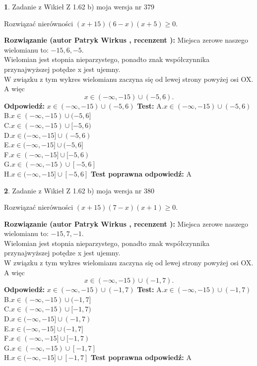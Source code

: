 \documentclass[12pt, a4paper]{article}
\theoremstyle{definition} %
\newtheorem{zad}{}
\newcommand{\zadStart}[1]{\begin{zad}#1\newline}
\newcommand{\zadStop}{\end{zad}}
\newcommand{\rozwStart}[2]{\noindent \textbf{Rozwiązanie (autor #1 , recenzent #2): }\newline}
\newcommand{\rozwStop}{\newline}
\newcommand{\odpStart}{\noindent \textbf{Odpowiedź:}\newline}
\newcommand{\odpStop}{\newline}
\newcommand{\testStart}{\noindent \textbf{Test:}\newline}
\newcommand{\testStop}{\newline}
\newcommand{\kluczStart}{\noindent \textbf{Test poprawna odpowiedź:}\newline}
\newcommand{\kluczStop}{\newline}
\begin{document}
\zadStart{Zadanie z Wikieł Z 1.62 b) moja wersja nr 379}

Rozwiązać nierówności $(x+15)(6-x)(x+5)\ge0$.
\zadStop
\rozwStart{Patryk Wirkus}{}
Miejsca zerowe naszego wielomianu to: $-15, 6, -5$.\\
Wielomian jest stopnia nieparzystego, ponadto znak współczynnika przy\linebreak najwyższej potędze x jest ujemny.\\ W związku z tym wykres wielomianu zaczyna się od lewej strony powyżej osi OX. A więc $$x \in (-\infty,-15) \cup (-5,6).$$
\rozwStop
\odpStart
$x \in (-\infty,-15) \cup (-5,6)$
\odpStop
\testStart
A.$x \in (-\infty,-15) \cup (-5,6)$\\
B.$x \in (-\infty,-15) \cup (-5,6]$\\
C.$x \in (-\infty,-15) \cup [-5,6)$\\
D.$x \in (-\infty,-15] \cup (-5,6)$\\
E.$x \in (-\infty,-15] \cup (-5,6]$\\
F.$x \in (-\infty,-15] \cup [-5,6)$\\
G.$x \in (-\infty,-15) \cup [-5,6]$\\
H.$x \in (-\infty,-15] \cup [-5,6]$
\testStop
\kluczStart
A
\kluczStop



\zadStart{Zadanie z Wikieł Z 1.62 b) moja wersja nr 380}

Rozwiązać nierówności $(x+15)(7-x)(x+1)\ge0$.
\zadStop
\rozwStart{Patryk Wirkus}{}
Miejsca zerowe naszego wielomianu to: $-15, 7, -1$.\\
Wielomian jest stopnia nieparzystego, ponadto znak współczynnika przy\linebreak najwyższej potędze x jest ujemny.\\ W związku z tym wykres wielomianu zaczyna się od lewej strony powyżej osi OX. A więc $$x \in (-\infty,-15) \cup (-1,7).$$
\rozwStop
\odpStart
$x \in (-\infty,-15) \cup (-1,7)$
\odpStop
\testStart
A.$x \in (-\infty,-15) \cup (-1,7)$\\
B.$x \in (-\infty,-15) \cup (-1,7]$\\
C.$x \in (-\infty,-15) \cup [-1,7)$\\
D.$x \in (-\infty,-15] \cup (-1,7)$\\
E.$x \in (-\infty,-15] \cup (-1,7]$\\
F.$x \in (-\infty,-15] \cup [-1,7)$\\
G.$x \in (-\infty,-15) \cup [-1,7]$\\
H.$x \in (-\infty,-15] \cup [-1,7]$
\testStop
\kluczStart
A
\kluczStop
\end{document}
